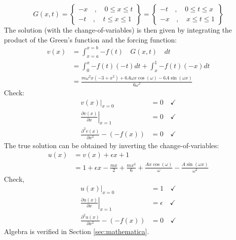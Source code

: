 \documentclass[10pt]{article}
\begin{document}
\begin{equation}
    \label{eqn:green}
    G(x,t) = 
    \left\{ \begin{matrix}
        -x \quad , \quad 0 \le x \le t \\ 
        -t \quad , \quad t \le x \le 1
    \end{matrix} \right\}
    =
    \left\{ \begin{matrix}
        -t \quad , \quad 0 \le t \le x \\ 
        -x \quad , \quad x \le t \le 1
    \end{matrix} \right\} 
\end{equation}
The solution (with the change-of-variables) is then given by integrating the product of the Green's function and the forcing function:
\begin{equation}
    \label{eqn:v(x)}
    \begin{split}
        v(x) &= \int_{x=a}^{x=b}{-f(t) \quad G(x,t) \quad dt} \\
        &= \int_{0}^{x}{-f(t)(-t)dt} + \int_{x}^{1}{-f(t)(-x)dt} \\
        &= \frac{m \omega^2 x (-3 + x^2) + 6 A \omega x \cos(\omega) - 
        6 A \sin(\omega x)}{6 \omega^2}
    \end{split}
\end{equation}
Check:
\begin{equation}
    \begin{split}
        \left. v(x) \right|_{x=0} &= 0 \quad \checkmark \\
        \left. \frac{\partial v(x)}{\partial x} \right|_{x=1} &= 0 \quad \checkmark \\
        \frac{\partial^2 v(x)}{\partial x^2} - (-f(x)) &= 0 \quad \checkmark
    \end{split}
\end{equation}
The true solution can be obtained by inverting the change-of-variables:
\begin{equation}
    \label{eqn:u(x)}
    \begin{split}
        u(x) &= v(x) + \epsilon x + 1 \\
        &= 1 + \epsilon x - \frac{m x}{2} + \frac{m x^3}{6} + \frac{A x \cos(\omega)}{\omega} -
        \frac{A \sin(\omega x)}{\omega^2}
    \end{split}
\end{equation}
Check, 
\begin{equation}
    \begin{split}
        \left. u(x) \right|_{x=0} &= 1 \quad \checkmark \\
        \left. \frac{\partial u(x)}{\partial x} \right|_{x=1} &= \epsilon \quad \checkmark \\
        \frac{\partial^2 u(x)}{\partial x^2} - (-f(x)) &= 0 \quad \checkmark
    \end{split}
\end{equation}
Algebra is verified in Section \ref{sec:mathematica}.
\end{document}
